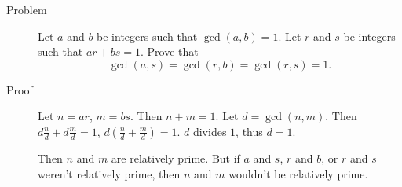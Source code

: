 \begin{description}
\item[Problem] Let $a$ and $b$ be integers such that $\gcd(a, b) = 1$. Let $r$
and $s$ be integers such that $ar + bs = 1$. Prove that
$$\gcd(a,s) = \gcd(r, b) = \gcd(r, s) = 1.$$

\item[Proof] Let $n = ar$, $m = bs$. Then $n + m = 1$. Let $d = \gcd(n, m)$.
Then $d\frac{n}{d} + d \frac{m}{d} = 1$, $d\left(\frac n d + \frac m d\right) =
1$. $d$ divides $1$, thus $d = 1$.

Then $n$ and $m$ are relatively prime. But if $a$ and $s$, $r$ and $b$, or $r$
and $s$ weren't relatively prime, then $n$ and $m$ wouldn't be relatively
prime.

\end{description}
